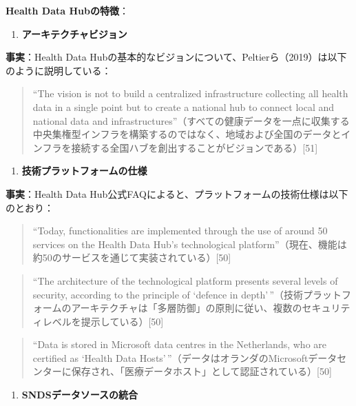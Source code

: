 \documentclass[
  a4paper,
  a4paper,
  11pt]{ltjsbook}
\providecommand{\tightlist}{%
  \setlength{\itemsep}{0pt}\setlength{\parskip}{0pt}}
\begin{document}
\textbf{Health Data Hubの特徴}：

\begin{enumerate}
\def\labelenumi{\arabic{enumi}.}
\tightlist
\item
  \textbf{アーキテクチャビジョン}
\end{enumerate}

\textbf{事実}：Health Data
Hubの基本的なビジョンについて、Peltierら（2019）は以下のように説明している：

\begin{quote}
``The vision is not to build a centralized infrastructure collecting all
health data in a single point but to create a national hub to connect
local and national data and
infrastructures''（すべての健康データを一点に収集する中央集権型インフラを構築するのではなく、地域および全国のデータとインフラを接続する全国ハブを創出することがビジョンである）{[}51{]}
\end{quote}

\begin{enumerate}
\def\labelenumi{\arabic{enumi}.}
\setcounter{enumi}{1}
\tightlist
\item
  \textbf{技術プラットフォームの仕様}
\end{enumerate}

\textbf{事実}：Health Data
Hub公式FAQによると、プラットフォームの技術仕様は以下のとおり：

\begin{quote}
``Today, functionalities are implemented through the use of around 50
services on the Health Data Hub's technological
platform''（現在、機能は約50のサービスを通じて実装されている）{[}50{]}
\end{quote}

\begin{quote}
``The architecture of the technological platform presents several levels
of security, according to the principle of `defence in
depth'\,''（技術プラットフォームのアーキテクチャは「多層防御」の原則に従い、複数のセキュリティレベルを提示している）{[}50{]}
\end{quote}

\begin{quote}
``Data is stored in Microsoft data centres in the Netherlands, who are
certified as `Health Data
Hosts'\,''（データはオランダのMicrosoftデータセンターに保存され、「医療データホスト」として認証されている）{[}50{]}
\end{quote}

\begin{enumerate}
\def\labelenumi{\arabic{enumi}.}
\setcounter{enumi}{2}
\tightlist
\item
  \textbf{SNDSデータソースの統合}
\end{enumerate}
\end{document}
